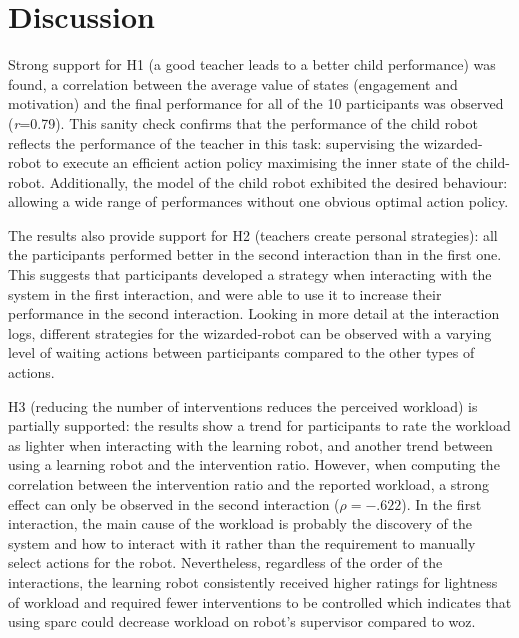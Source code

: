 
\section{Discussion}

Strong support for H1 (a good teacher leads to a better child performance) was found, a correlation between the average value of states (engagement and motivation) and the final performance for all of the 10 participants was observed (\textit{r}=0.79). This sanity check confirms that the performance of the child robot reflects the performance of the teacher in this task: supervising the wizarded-robot to execute an efficient action policy maximising the inner state of the child-robot. Additionally, the model of the child robot exhibited the desired behaviour: allowing a wide range of performances without one obvious optimal action policy.

The results also provide support for H2 (teachers create personal strategies): all the participants performed better in the second interaction than in the first one. This suggests that participants developed a strategy when interacting with the system in the first interaction, and were able to use it to increase their performance in the second interaction. Looking in more detail at the interaction logs, different strategies for the wizarded-robot can be observed with a varying level of waiting actions between participants compared to the other types of actions.

H3 (reducing the number of interventions reduces the perceived workload) is partially supported: the results show a trend for participants to rate the workload as lighter when interacting with the learning robot, and another trend between using a learning robot and the intervention ratio. However, when computing the correlation between the intervention ratio and the reported workload, a strong effect can only be observed in the second interaction ($\rho = -.622$). In the first interaction, the main cause of the workload is probably the discovery of the system and how to interact with it rather than the requirement to manually select actions for the robot. Nevertheless, regardless of the order of the interactions, the learning robot consistently received higher ratings for lightness of workload and required fewer interventions to be controlled which indicates that using \gls{sparc} could decrease workload on robot's supervisor compared to \gls{woz}.

